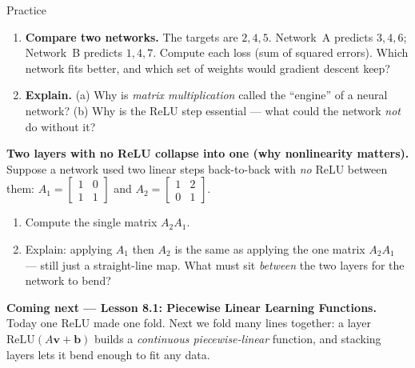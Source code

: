 \documentclass[10pt]{article}
\newcommand{\vv}{\mathbf{v}}
\newcommand{\bb}{\mathbf{b}}
\newcommand{\relu}{\mathrm{ReLU}}
\begin{document}
\begin{notesbox}{Practice}
\begin{enumerate}[leftmargin=1.9em, itemsep=12pt]
        $F(5)$. Where are the two folds, and describe the shape (what does the graph do after $x=3$)?
  \item \textbf{Compare two networks.} The targets are $2,4,5$. Network~A predicts $3,4,6$; Network~B
        predicts $1,4,7$. Compute each loss (sum of squared errors). Which network fits better, and which
        set of weights would gradient descent keep? 
  \item \textbf{Explain.} (a) Why is \emph{matrix multiplication} called the ``engine'' of a neural
        network? (b) Why is the ReLU step essential --- what could the network \emph{not} do without it?
\end{enumerate}
\end{notesbox}

\begin{extensionbox}
\textbf{Two layers with no ReLU collapse into one (why nonlinearity matters).} Suppose a network used two
linear steps back-to-back with \emph{no} ReLU between them:
$A_1=\begin{bmatrix} 1 & 0 \\ 1 & 1 \end{bmatrix}$ and $A_2=\begin{bmatrix} 1 & 2 \\ 0 & 1 \end{bmatrix}$.
\begin{enumerate}[label=(\alph*), leftmargin=1.8em, itemsep=5pt]
  \item Compute the single matrix $A_2A_1$.
  \item Explain: applying $A_1$ then $A_2$ is the same as applying the one matrix $A_2A_1$ --- still just a
        straight-line map. What must sit \emph{between} the two layers for the network to bend?
\end{enumerate}
\end{extensionbox}

\begin{spiralbox}
\textbf{Coming next --- Lesson 8.1: Piecewise Linear Learning Functions.} Today one ReLU made one fold.
Next we fold many lines together: a layer $\relu(A\vv+\bb)$ builds a \emph{continuous piecewise-linear}
function, and stacking layers lets it bend enough to fit any data.
\end{spiralbox}
\end{document}
